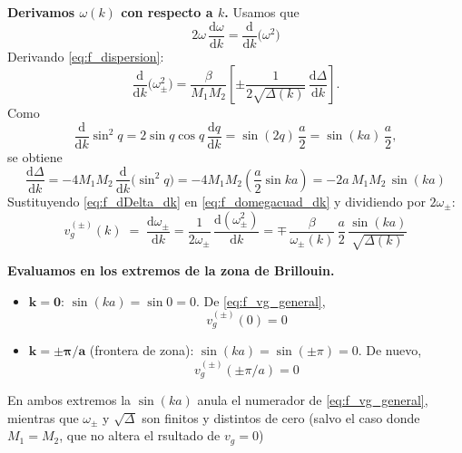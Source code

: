 \documentclass{article}
\begin{document}
\vspace{0.4cm}
\textcolor{Tarawera}{\textbf{ Derivamos \(\omega(k)\) con respecto a \(k\).}}
Usamos que
\[
2\omega\,\frac{\mathrm d\omega}{\mathrm dk}
= \frac{\mathrm d}{\mathrm dk}\!\big(\omega^2\big)
\]
Derivando \eqref{eq:f_dispersion}:
\begin{equation}
\frac{\mathrm d}{\mathrm dk}\big(\omega_\pm^2\big)
= \frac{\beta}{M_1M_2}\left[
\pm \frac{1}{2\sqrt{\Delta(k)}}\,\frac{\mathrm d\Delta}{\mathrm dk}
\right].
\label{eq:f_domegacuad_dk}
\end{equation}
Como
\[
\frac{\mathrm d}{\mathrm dk}\sin^{2}q
= 2\sin q\cos q\,\frac{\mathrm dq}{\mathrm dk}
= \sin(2q)\,\frac{a}{2}
= \sin(ka)\,\frac{a}{2},
\]
se obtiene
\begin{equation}
\frac{\mathrm d\Delta}{\mathrm dk}
= -4M_1M_2\,\frac{\mathrm d}{\mathrm dk}\big(\sin^{2}q\big)
= -4M_1M_2\left(\frac{a}{2}\sin ka\right)
= -2a\,M_1M_2\,\sin(ka)
\label{eq:f_dDelta_dk}
\end{equation}
Sustituyendo \eqref{eq:f_dDelta_dk} en \eqref{eq:f_domegacuad_dk} y dividiendo por \(2\omega_\pm\):
\begin{equation}
v_g^{(\pm)}(k)\;=\;\frac{\mathrm d\omega_\pm}{\mathrm dk}
=\frac{1}{2\omega_\pm}\,\frac{\mathrm d(\omega_\pm^2)}{\mathrm dk}
= \mp\,\frac{\beta}{\omega_\pm(k)}\,
\frac{a}{2}\,\frac{\sin(ka)}{\sqrt{\Delta(k)}}
\label{eq:f_vg_general}
\end{equation}

\vspace{0.4cm}
\textcolor{Tarawera}{\textbf{Evaluamos en los extremos de la zona de Brillouin.}}
\begin{itemize}
  \item[$\bullet$] \(\boldsymbol{k=0}\): \(\sin(ka)=\sin 0=0\). De \eqref{eq:f_vg_general},
  \[
  v_g^{(\pm)}(0)=0
  \]
  \item[$\bullet$] \(\boldsymbol{k=\pm\pi/a}\) (frontera de zona): \(\sin(ka)=\sin(\pm\pi)=0\). De nuevo,
  \[
  v_g^{(\pm)}(\pm\pi/a)=0
  \]
\end{itemize}
En ambos extremos la \(\sin(ka)\) anula el numerador de \eqref{eq:f_vg_general}, mientras que
\(\omega_\pm\) y \(\sqrt{\Delta}\) son finitos y distintos de cero (salvo el caso
donde\(M_1=M_2\), que no altera el rsultado de \(v_g=0\))
\end{document}
